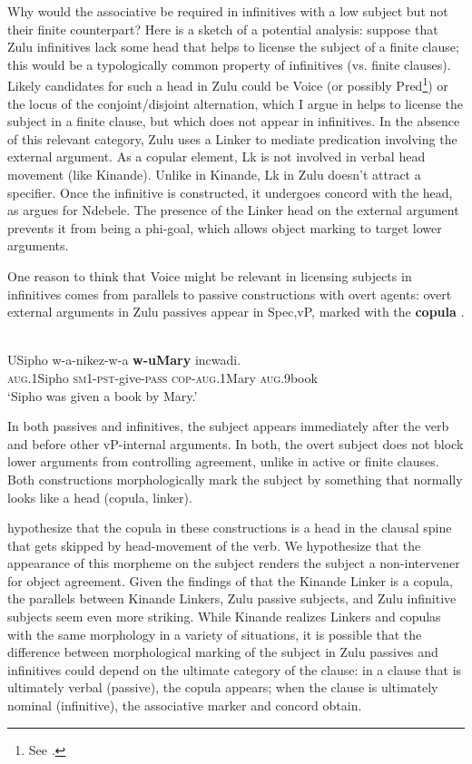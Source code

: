 \documentclass[output=paper,colorlinks,citecolor=brown]{langscibook}
\begin{document}
Why would the associative be required in infinitives with a low subject but not their finite counterpart? Here is a sketch of a potential analysis: suppose that Zulu infinitives lack some head that helps to license the subject of a finite clause; this would be a typologically common property of infinitives (vs. finite clauses).  Likely candidates for such a head in Zulu could be Voice (or possibly Pred\footnote{See \citet{Zeller2013}.}) or the locus of the conjoint/disjoint alternation, which I argue in \citet{Halpert2015} helps to license the subject in a finite clause, but which does not appear in infinitives. In the absence of this relevant category, Zulu uses a Linker to mediate predication involving the external argument. As a copular element, Lk is not involved in verbal head movement (like Kinande).
Unlike in Kinande, Lk in Zulu doesn't attract a specifier. Once the infinitive is constructed, it undergoes concord with the head, as \citet{Pietraszko2019} argues for Ndebele.  The presence of the Linker head on the external argument prevents it from being a phi-goal, which allows object marking to target lower arguments.

One reason to think that Voice might be relevant in licensing subjects in infinitives comes from parallels to passive constructions with overt agents: overt external arguments in Zulu passives appear in Spec,vP,  marked with the \textbf{copula} \citep{HalpertZeller2016}.

\ea%
    \label{ex:halpert:21}
    \\
    \gll    USipho 		w-a-nikez-w-a 		\textbf{w-uMary} 			incwadi.\\
			\textsc{aug}.1Sipho	\textsc{sm}1-\textsc{pst}-give-\textsc{pass}	\textsc{cop}-\textsc{aug}.1Mary	\textsc{aug}.9book\\
    \glt    `Sipho was given a book by Mary.'
\z 

In both passives and infinitives, the subject appears immediately after the verb and before other vP-internal arguments. In both, the overt subject does not block lower arguments from controlling agreement, unlike in active or finite clauses. Both constructions  morphologically mark the subject by something that normally looks like a head (copula, linker).

\citet{HalpertZeller2016} hypothesize that the copula in these constructions is a head in the clausal spine that gets skipped by head-movement of the verb.  We hypothesize that the appearance of this morpheme on the subject renders the subject a non-intervener for object agreement.  Given the findings of \citet{Schneider-Zioga2015WCCFL, Schneider-Zioga2015ACAL} that the Kinande Linker is a copula, the parallels between Kinande Linkers, Zulu passive subjects, and Zulu infinitive subjects seem even more striking.  While Kinande realizes Linkers and copulas with the same morphology in a variety of situations, it is possible that the difference between morphological marking of the subject in Zulu passives and infinitives could depend on the ultimate category of the clause: in a clause that is ultimately verbal (passive), the copula appears; when the clause is ultimately nominal (infinitive), the associative marker and concord obtain.
\end{document}
